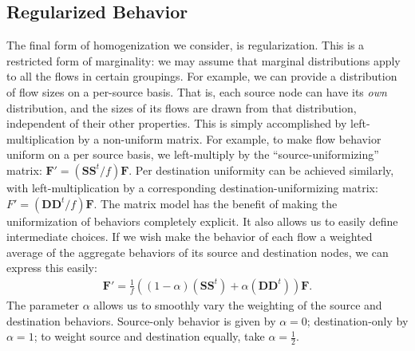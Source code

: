 \documentclass[twocolumn,final]{svjour3}
\newcommand{\mat}[1]{\mathbf{#1}}
\begin{document}
\subsection{Regularized Behavior}

The final form of homogenization we consider, is regularization. This is a restricted form of marginality: we may assume that marginal distributions apply to all the flows in certain groupings. For example, we can provide a distribution of flow sizes on a per-source basis. That is, each source node can have its \textit{own} distribution, and the sizes of its flows are drawn from that distribution, independent of their other properties. This is simply accomplished by left-multiplication by a non-uniform matrix. For example, to make flow behavior uniform on a per source basis, we left-multiply by the ``source-uniformizing'' matrix: $\mat{F}'=(\mat{SS}^t/f)\mat{F}$. Per destination uniformity can be achieved similarly, with left-multiplication by a corresponding destination-uniformizing matrix: $F'=(\mat{DD}^t/f)\mat{F}$.
The matrix model has the benefit of making the uniformization of behaviors completely explicit. It also allows us to easily define intermediate choices. If we wish make the behavior of each flow a weighted average of the aggregate behaviors of its source and destination nodes, we can express this easily:
\begin{align}
\mat{F}' = \frac{1}{f}((1-\alpha)(\mat{SS}^t)+\alpha(\mat{DD}^t))\mat{F}.
\end{align}
The parameter $\alpha$ allows us to smoothly vary the weighting of the source and destination behaviors. Source-only behavior is given by $\alpha=0$; destination-only by $\alpha=1$; to weight source and destination equally, take $\alpha=\frac{1}{2}$.

\end{document}
